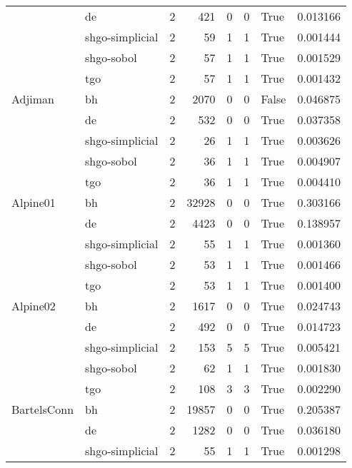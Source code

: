 \begin{longtable}{llrrrrlr}
         & de &     2 &      421 &      0 &       0 &    True &    0.013166 \\
         & shgo-simplicial &     2 &       59 &      1 &       1 &    True &    0.001444 \\
         & shgo-sobol &     2 &       57 &      1 &       1 &    True &    0.001529 \\
         & tgo &     2 &       57 &      1 &       1 &    True &    0.001432 \\
Adjiman & bh &     2 &     2070 &      0 &       0 &   False &    0.046875 \\
         & de &     2 &      532 &      0 &       0 &    True &    0.037358 \\
         & shgo-simplicial &     2 &       26 &      1 &       1 &    True &    0.003626 \\
         & shgo-sobol &     2 &       36 &      1 &       1 &    True &    0.004907 \\
         & tgo &     2 &       36 &      1 &       1 &    True &    0.004410 \\
Alpine01 & bh &     2 &    32928 &      0 &       0 &    True &    0.303166 \\
         & de &     2 &     4423 &      0 &       0 &    True &    0.138957 \\
         & shgo-simplicial &     2 &       55 &      1 &       1 &    True &    0.001360 \\
         & shgo-sobol &     2 &       53 &      1 &       1 &    True &    0.001466 \\
         & tgo &     2 &       53 &      1 &       1 &    True &    0.001400 \\
Alpine02 & bh &     2 &     1617 &      0 &       0 &    True &    0.024743 \\
         & de &     2 &      492 &      0 &       0 &    True &    0.014723 \\
         & shgo-simplicial &     2 &      153 &      5 &       5 &    True &    0.005421 \\
         & shgo-sobol &     2 &       62 &      1 &       1 &    True &    0.001830 \\
         & tgo &     2 &      108 &      3 &       3 &    True &    0.002290 \\
BartelsConn & bh &     2 &    19857 &      0 &       0 &    True &    0.205387 \\
         & de &     2 &     1282 &      0 &       0 &    True &    0.036180 \\
         & shgo-simplicial &     2 &       55 &      1 &       1 &    True &    0.001298 \\

\end{longtable}
